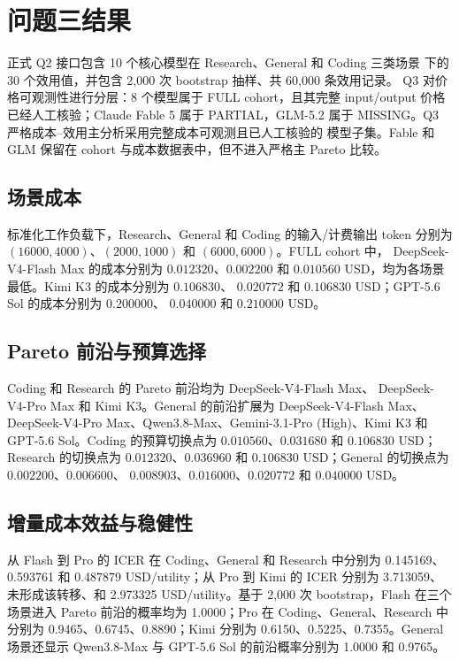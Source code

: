\section{问题三结果}

正式 Q2 接口包含 10 个核心模型在 Research、General 和 Coding 三类场景
下的 30 个效用值，并包含 2,000 次 bootstrap 抽样、共 60,000 条效用记录。
Q3 对价格可观测性进行分层：8 个模型属于 FULL cohort，且其完整
input/output 价格已经人工核验；Claude Fable 5 属于 PARTIAL，GLM-5.2
属于 MISSING。Q3 严格成本--效用主分析采用完整成本可观测且已人工核验的
模型子集。Fable 和 GLM 保留在 cohort 与成本数据表中，但不进入严格主
Pareto 比较。

\subsection{场景成本}

标准化工作负载下，Research、General 和 Coding 的输入/计费输出 token
分别为 $(16000,4000)$、$(2000,1000)$ 和 $(6000,6000)$。FULL cohort 中，
DeepSeek-V4-Flash Max 的成本分别为 $0.012320$、$0.002200$ 和
$0.010560$ USD，均为各场景最低。Kimi K3 的成本分别为 $0.106830$、
$0.020772$ 和 $0.106830$ USD；GPT-5.6 Sol 的成本分别为 $0.200000$、
$0.040000$ 和 $0.210000$ USD。

\subsection{Pareto 前沿与预算选择}

Coding 和 Research 的 Pareto 前沿均为 DeepSeek-V4-Flash Max、
DeepSeek-V4-Pro Max 和 Kimi K3。General 的前沿扩展为 DeepSeek-V4-Flash
Max、DeepSeek-V4-Pro Max、Qwen3.8-Max、Gemini-3.1-Pro (High)、Kimi K3
和 GPT-5.6 Sol。Coding 的预算切换点为 $0.010560$、$0.031680$ 和
$0.106830$ USD；Research 的切换点为 $0.012320$、$0.036960$ 和
$0.106830$ USD；General 的切换点为 $0.002200$、$0.006600$、
$0.008903$、$0.016000$、$0.020772$ 和 $0.040000$ USD。

\subsection{增量成本效益与稳健性}

从 Flash 到 Pro 的 ICER 在 Coding、General 和 Research 中分别为
0.145169、0.593761 和 0.487879 USD/utility；从 Pro 到 Kimi 的 ICER
分别为 3.713059、未形成该转移、和 2.973325 USD/utility。基于 2,000 次
bootstrap，Flash 在三个场景进入 Pareto 前沿的概率均为 1.0000；Pro 在
Coding、General、Research 中分别为 0.9465、0.6745、0.8890；Kimi
分别为 0.6150、0.5225、0.7355。General 场景还显示 Qwen3.8-Max 与
GPT-5.6 Sol 的前沿概率分别为 1.0000 和 0.9765。

